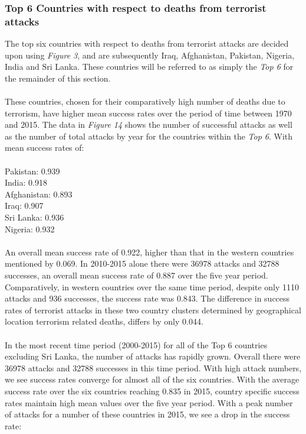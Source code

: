\documentclass[10pt,a4paper]{article}
\begin{document}
\subsubsection{Top 6 Countries with respect to deaths from terrorist attacks}
The top six countries with respect to deaths from terrorist attacks are decided upon using \textit{Figure 3}, and are subsequently Iraq, Afghanistan, Pakistan, Nigeria, India and Sri Lanka. These countries will be referred to as simply the \textit{Top 6} for the remainder of this section.
\\\\
These countries, chosen for their comparatively high number of deaths due to terrorism, have higher mean success rates over the period of time between 1970 and 2015.
The data in \textit{Figure 14} shows the number of successful attacks as well as the number of total attacks by year for the countries within the \textit{Top 6}. With mean success rates of:
\\\\ 
\indent Pakistan: 0.939\\
\indent India: 0.918\\
\indent Afghanistan: 0.893\\
\indent Iraq: 0.907\\
\indent Sri Lanka: 0.936\\
\indent Nigeria: 0.932\\
\\
An overall mean success rate of 0.922, higher than that in the western countries mentioned by 0.069. In 2010-2015 alone there were 36978 attacks and 32788 successes, an overall mean success rate of 0.887 over the five year period. Comparatively, in western countries over the same time period, despite only 1110 attacks and 936 successes, the success rate was 0.843. The difference in success rates of terrorist attacks in these two country clusters determined by geographical location terrorism related deaths, differs by only 0.044.
\\\\
In the most recent time period (2000-2015) for all of the Top 6 countries excluding Sri Lanka, the number of attacks has rapidly grown. Overall there were 36978 attacks and 32788 successes in this time period. With high attack numbers, we see success rates converge for almost all of the six countries. With the average success rate over the six countries reaching 0.835 in 2015, country specific success rates maintain high mean values over the five year period. With a peak number of attacks for a number of these countries in 2015, we see a drop in the success rate:
\end{document}
